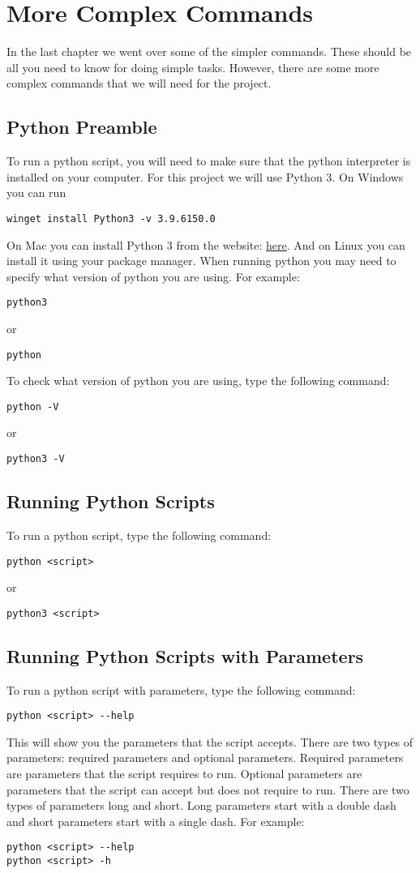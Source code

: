 \documentclass[11pt]{report}
\begin{document}
\chapter{More Complex Commands}
In the last chapter we went over some of the simpler commands. These should be all you need to know for doing simple tasks. However, there are some more complex commands that we will need for the project.

\section{Python Preamble}
To run a python script, you will need to make sure that the python interpreter is installed on your computer. For this project we will use Python 3. On Windows you can run
\begin{verbatim}
winget install Python3 -v 3.9.6150.0
\end{verbatim}
On Mac you can install Python 3 from the website:
\href{https://python.org/download}{here}. And on Linux you can install it using your package manager. When running python you may need to specify what version of python you are using. For example:
\begin{verbatim}
python3 
\end{verbatim}
or
\begin{verbatim}
python 
\end{verbatim}
To check what version of python you are using, type the following command:
\begin{verbatim}
python -V
\end{verbatim}
or
\begin{verbatim}
python3 -V
\end{verbatim}
\section{Running Python Scripts}
To run a python script, type the following command:
\begin{verbatim}
python <script>
\end{verbatim}
or 
\begin{verbatim}
python3 <script>
\end{verbatim}

\section{Running Python Scripts with Parameters}
To run a python script with parameters, type the following command:
\begin{verbatim}
python <script> --help
\end{verbatim}
This will show you the parameters that the script accepts.
There are two types of parameters: required parameters and optional parameters.
Required parameters are parameters that the script requires to run. Optional parameters are parameters that the script can accept but does not require to run. There are two types of parameters long and short. Long parameters start with a double dash and short parameters start with a single dash. For example:
\begin{verbatim}
python <script> --help
python <script> -h
\end{verbatim}
\end{document}
